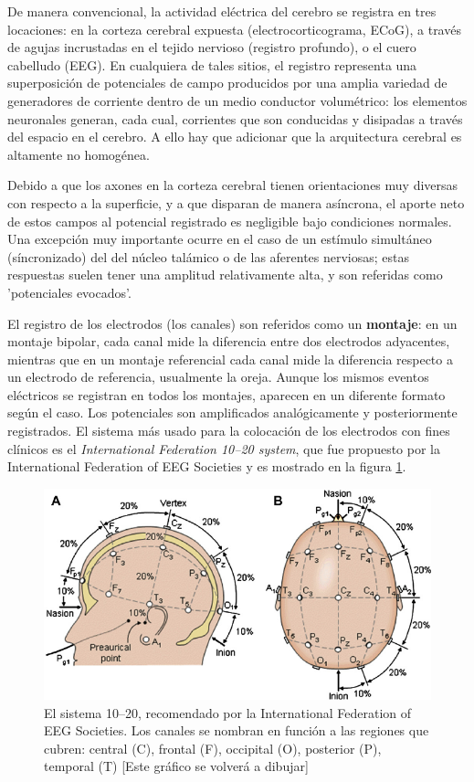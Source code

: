\documentclass[12pt,a4paper]{mitthesis}
\begin{document}
De manera convencional, la actividad el\'ectrica del cerebro se registra en tres locaciones: en la 
corteza cerebral expuesta (electrocorticograma, ECoG), a trav\'es de agujas incrustadas en el 
tejido nervioso (registro profundo), o el cuero cabelludo (EEG).
En cualquiera de tales sitios, el registro representa una superposici\'on de potenciales de campo 
producidos por una amplia variedad de generadores de corriente dentro de un medio conductor 
volum\'etrico: los elementos neuronales generan, cada cual, corrientes que son conducidas y 
disipadas a trav\'es del espacio en el cerebro.
A ello hay que adicionar que la arquitectura cerebral es altamente no homog\'enea.

Debido a que los axones en la corteza cerebral tienen orientaciones muy diversas con respecto a la 
superficie, y a que disparan de manera as\'incrona, el aporte neto de estos campos al potencial 
registrado es negligible bajo condiciones normales.
Una excepci\'on muy importante ocurre en el caso de un est\'imulo simult\'aneo (s\'incronizado) del 
del n\'ucleo tal\'amico o de las aferentes nerviosas; estas respuestas suelen tener 
una amplitud relativamente alta, y son referidas como 'potenciales evocados'.

El registro de los electrodos (los canales) son referidos como un \textbf{montaje}: en un montaje 
bipolar, cada canal mide la diferencia entre dos electrodos adyacentes, mientras que en un montaje 
referencial cada canal mide la diferencia respecto a un electrodo de referencia, usualmente la 
oreja.
Aunque los mismos eventos el\'ectricos se registran en todos los montajes, aparecen en un diferente 
formato seg\'un el caso. 
Los potenciales son amplificados anal\'ogicamente y posteriormente registrados.
El sistema m\'as usado para la colocaci\'on de los electrodos con fines cl\'inicos es el 
\textit{International Federation 10--20 system}, que fue propuesto por la International Federation 
of EEG Societies \cite{Jasper58,AASM07} y es mostrado en la figura \ref{img1020}. 

\begin{figure}
\centering
\includegraphics[width=0.9\linewidth]{Fig.png} 
\caption{El sistema 10--20, recomendado por la
International Federation of EEG Societies. Los canales se nombran en funci\'on a las regiones
que cubren: central (C), frontal (F), occipital (O), posterior (P), temporal (T) [Este gr\'afico se volver\'a a dibujar]
}
\label{img1020}
\end{figure}
\end{document}
